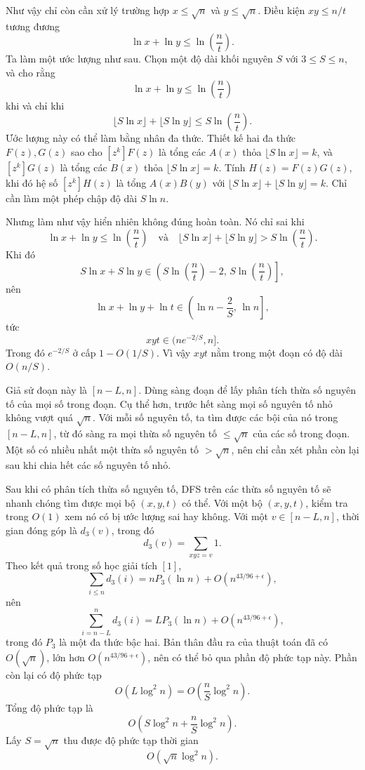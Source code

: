 \documentclass[11pt]{article}
\begin{document}
Như vậy chỉ còn cần xử lý trường hợp \(x\le\sqrt n\) và \(y\le\sqrt n\).
Điều kiện \(xy\le n/t\) tương đương
\[
  \ln x+\ln y\le \ln\left(\frac{n}{t}\right).
\]
Ta làm một ước lượng như sau. Chọn một độ dài khối nguyên \(S\) với
\(3\le S\le n\), và cho rằng
\[
  \ln x+\ln y\le \ln\left(\frac{n}{t}\right)
\]
khi và chỉ khi
\[
  \lfloor S\ln x\rfloor+\lfloor S\ln y\rfloor
  \le S\ln\left(\frac{n}{t}\right).
\]
Ước lượng này có thể làm bằng nhân đa thức. Thiết kế hai đa thức \(F(z),G(z)\)
sao cho \([z^k]F(z)\) là tổng các \(A(x)\) thỏa
\(\lfloor S\ln x\rfloor=k\), và \([z^k]G(z)\) là tổng các \(B(x)\) thỏa
\(\lfloor S\ln x\rfloor=k\). Tính \(H(z)=F(z)G(z)\), khi đó hệ số
\([z^k]H(z)\) là tổng \(A(x)B(y)\) với
\(\lfloor S\ln x\rfloor+\lfloor S\ln y\rfloor=k\). Chỉ cần làm một phép chập
độ dài \(S\ln n\).

Nhưng làm như vậy hiển nhiên không đúng hoàn toàn. Nó chỉ sai khi
\[
  \ln x+\ln y\le \ln\left(\frac{n}{t}\right)
  \quad\text{và}\quad
  \lfloor S\ln x\rfloor+\lfloor S\ln y\rfloor
  > S\ln\left(\frac{n}{t}\right).
\]
Khi đó
\[
  S\ln x+S\ln y\in
  \left(S\ln\left(\frac{n}{t}\right)-2,\,
        S\ln\left(\frac{n}{t}\right)\right],
\]
nên
\[
  \ln x+\ln y+\ln t\in
  \left(\ln n-\frac{2}{S},\,\ln n\right],
\]
tức
\[
  xyt\in (ne^{-2/S},n].
\]
Trong đó \(e^{-2/S}\) ở cấp \(1-O(1/S)\). Vì vậy \(xyt\) nằm trong một đoạn có
độ dài \(O(n/S)\).

Giả sử đoạn này là \([n-L,n]\). Dùng sàng đoạn để lấy phân tích thừa số nguyên
tố của mọi số trong đoạn. Cụ thể hơn, trước hết sàng mọi số nguyên tố nhỏ không
vượt quá \(\sqrt n\). Với mỗi số nguyên tố, ta tìm được các bội của nó trong
\([n-L,n]\), từ đó sàng ra mọi thừa số nguyên tố \(\le\sqrt n\) của các số
trong đoạn. Một số có nhiều nhất một thừa số nguyên tố \(>\sqrt n\), nên chỉ
cần xét phần còn lại sau khi chia hết các số nguyên tố nhỏ.

Sau khi có phân tích thừa số nguyên tố, DFS trên các thừa số nguyên tố sẽ nhanh
chóng tìm được mọi bộ \((x,y,t)\) có thể. Với một bộ \((x,y,t)\), kiểm tra trong
\(O(1)\) xem nó có bị ước lượng sai hay không. Với một
\(v\in[n-L,n]\), thời gian đóng góp là \(d_3(v)\), trong đó
\[
  d_3(v)=\sum_{xyz=v}1.
\]
Theo kết quả trong số học giải tích \([1]\),
\[
  \sum_{i\le n} d_3(i)=nP_3(\ln n)+O(n^{43/96+\epsilon}),
\]
nên
\[
  \sum_{i=n-L}^{n} d_3(i)=LP_3(\ln n)+O(n^{43/96+\epsilon}),
\]
trong đó \(P_3\) là một đa thức bậc hai. Bản thân đầu ra của thuật toán đã có
\(O(\sqrt n)\), lớn hơn \(O(n^{43/96+\epsilon})\), nên có thể bỏ qua phần độ
phức tạp này. Phần còn lại có độ phức tạp
\[
  O(L\log^2 n)=O\left(\frac{n}{S}\log^2 n\right).
\]
Tổng độ phức tạp là
\[
  O\left(S\log^2 n+\frac{n}{S}\log^2 n\right).
\]
Lấy \(S=\sqrt n\) thu được độ phức tạp thời gian
\[
  O(\sqrt n\log^2 n).
\]
\end{document}
